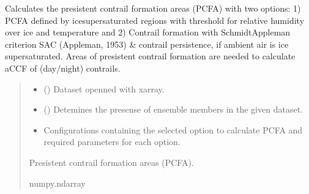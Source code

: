 \documentclass[a4paper,11pt,english]{sphinxmanual}
\begin{document}

\begin{fulllineitems}
\label{\detokenize{modules:climaccf.contrail.get_pcfa}}
\pysigstartsignatures
{}
\pysigstopsignatures
\sphinxAtStartPar
Calculates the presistent contrail formation areas (PCFA) with two options: 1) PCFA defined by ice\sphinxhyphen{}supersaturated regions with threshold for relative humidity over ice and temperature and 2) Contrail formation with Schmidt\sphinxhyphen{}Appleman criterion SAC (Appleman, 1953) \& contrail persistence, if ambient air is ice supersaturated. Areas of presistent contrail formation are needed to calculate aCCF of (day/night) contrails.
\begin{quote}\begin{description}
\begin{itemize}
\item {} 
\sphinxAtStartPar
{} () \textendash{} Dataset openned with xarray.

\item {} 
\sphinxAtStartPar
{} () \textendash{} Detemines the presense of ensemble members in the given dataset.

\item {} 
\sphinxAtStartPar
{} \textendash{} Configurations containing the selected option to calculate PCFA and required parameters for each option.

\end{itemize}

\sphinxAtStartPar
Presistent contrail formation areas (PCFA).

\sphinxAtStartPar
numpy.ndarray

\end{description}\end{quote}

\end{fulllineitems}

\end{document}
